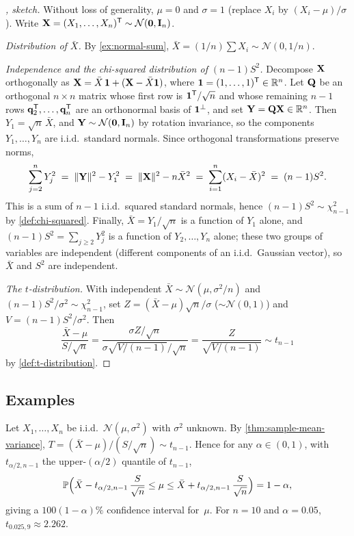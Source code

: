 \begin{proof}[, sketch]
Without loss of generality, $\mu = 0$ and $\sigma = 1$ (replace
$X_i$ by $(X_i - \mu)/\sigma$). Write $\mathbf{X} = (X_1, \dots, X_n)^{\mathsf{T}} \sim \mathcal{N}(\mathbf{0}, \mathbf{I}_n)$.

\emph{Distribution of $\bar X$.} By \cref{ex:normal-sum},
$\bar X = (1/n) \sum X_i \sim \mathcal{N}(0, 1/n)$.

\emph{Independence and the chi-squared distribution of $(n-1) S^2$.}
Decompose $\mathbf{X}$ orthogonally as
$\mathbf{X} = \bar X\, \mathbf{1} + (\mathbf{X} - \bar X \mathbf{1})$,
where $\mathbf{1} = (1, \dots, 1)^{\mathsf{T}} \in \mathbb{R}^n$. Let $\mathbf{Q}$ be an
orthogonal $n \times n$ matrix whose first row is $\mathbf{1}^{\mathsf{T}}/\sqrt n$
and whose remaining $n - 1$ rows $\mathbf{q}_2^{\mathsf{T}}, \dots, \mathbf{q}_n^{\mathsf{T}}$
are an orthonormal basis of $\mathbf{1}^{\perp}$, and set
$\mathbf{Y} = \mathbf{Q} \mathbf{X} \in \mathbb{R}^n$. Then $Y_1 = \sqrt n\, \bar X$,
and $\mathbf{Y} \sim \mathcal{N}(\mathbf{0}, \mathbf{I}_n)$ by rotation
invariance, so the components $Y_1, \dots, Y_n$ are i.i.d.\ standard
normals. Since orthogonal transformations preserve norms,
\[
  \sum_{j = 2}^{n} Y_j^2 \;=\; \|\mathbf{Y}\|^2 - Y_1^2 \;=\; \|\mathbf{X}\|^2 - n \bar X^2 \;=\; \sum_{i = 1}^{n} (X_i - \bar X)^2 \;=\; (n - 1) S^2.
\]
This is a sum of $n - 1$ i.i.d.\ squared standard normals, hence
$(n - 1) S^2 \sim \chi^2_{n - 1}$ by \cref{def:chi-squared}.
Finally, $\bar X = Y_1 / \sqrt n$ is a function of $Y_1$ alone, and
$(n - 1) S^2 = \sum_{j \geq 2} Y_j^2$ is a function of
$Y_2, \dots, Y_n$ alone; these two groups of variables are
independent (different components of an i.i.d.\ Gaussian vector),
so $\bar X$ and $S^2$ are independent.

\emph{The $t$-distribution.} With independent
$\bar X \sim \mathcal{N}(\mu, \sigma^2/n)$ and
$(n-1) S^2 / \sigma^2 \sim \chi^2_{n-1}$, set $Z = (\bar X - \mu) \sqrt n / \sigma$
($\sim \mathcal{N}(0, 1)$) and $V = (n-1) S^2/\sigma^2$. Then
\[
  \frac{\bar X - \mu}{S/\sqrt n} = \frac{\sigma Z/\sqrt n}{\sigma \sqrt{V/(n-1)}/\sqrt n} = \frac{Z}{\sqrt{V/(n-1)}} \sim t_{n - 1}
\]
by \cref{def:t-distribution}.
\end{proof}

\subsection*{Examples}

\begin{example}
\label{ex:t-confidence-interval}
Let $X_1, \dots, X_n$ be i.i.d.\ $\mathcal{N}(\mu, \sigma^2)$ with
$\sigma^2$ unknown. By \cref{thm:sample-mean-variance},
$T = (\bar X - \mu)/(S/\sqrt n) \sim t_{n - 1}$. Hence for any
$\alpha \in (0, 1)$, with $t_{\alpha/2, n-1}$ the upper-$(\alpha/2)$
quantile of $t_{n - 1}$,
\[
  \mathbb{P}\Bigl(\bar X - t_{\alpha/2, n-1}\, \frac{S}{\sqrt n} \leq \mu \leq \bar X + t_{\alpha/2, n-1}\, \frac{S}{\sqrt n}\Bigr) = 1 - \alpha,
\]
giving a $100(1 - \alpha)\%$ confidence interval for~$\mu$. For
$n = 10$ and $\alpha = 0.05$, $t_{0.025, 9} \approx 2.262$.
\end{example}

